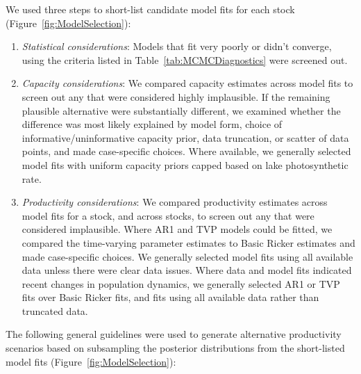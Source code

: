 \documentclass[french,11pt]{book}
\begin{document}
We used three steps to short-list candidate model fits for each stock (Figure~\ref{fig:ModelSelection}):
\begin{enumerate}
\def\labelenumi{\arabic{enumi}.}

\item
  \emph{Statistical considerations}: Models that fit very poorly or didn't converge, using the criteria listed in Table~\ref{tab:MCMCDiagnostics} were screened out.
\item
  \emph{Capacity considerations}: We compared capacity estimates across model fits to screen out any that were considered highly implausible. If the remaining plausible alternative were substantially different, we examined whether the difference was most likely explained by model form, choice of informative/uninformative capacity prior, data truncation, or scatter of data points, and made case-specific choices. Where available, we generally selected model fits with uniform capacity priors capped based on lake photosynthetic rate.
\item
  \emph{Productivity considerations}: We compared productivity estimates across model fits for a stock, and across stocks, to screen out any that were considered implausible. Where AR1 and TVP models could be fitted, we compared the time-varying parameter estimates to Basic Ricker estimates and made case-specific choices. We generally selected model fits using all available data unless there were clear data issues. Where data and model fits indicated recent changes in population dynamics, we generally selected AR1 or TVP fits over Basic Ricker fits, and fits using all available data rather than truncated data.
\end{enumerate}
The following general guidelines were used to generate alternative productivity scenarios based on subsampling the posterior distributions from the short-listed model fits (Figure~\ref{fig:ModelSelection}):
\end{document}
